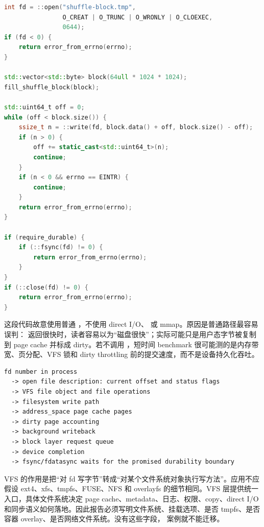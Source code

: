\begin{lstlisting}[language=C++,caption={write VFS probe：固定一个写入案例}]
int fd = ::open("shuffle-block.tmp",
                O_CREAT | O_TRUNC | O_WRONLY | O_CLOEXEC,
                0644);
if (fd < 0) {
    return error_from_errno(errno);
}

std::vector<std::byte> block(64ull * 1024 * 1024);
fill_shuffle_block(block);

std::uint64_t off = 0;
while (off < block.size()) {
    ssize_t n = ::write(fd, block.data() + off, block.size() - off);
    if (n > 0) {
        off += static_cast<std::uint64_t>(n);
        continue;
    }
    if (n < 0 && errno == EINTR) {
        continue;
    }
    return error_from_errno(errno);
}

if (require_durable) {
    if (::fsync(fd) != 0) {
        return error_from_errno(errno);
    }
}
if (::close(fd) != 0) {
    return error_from_errno(errno);
}
\end{lstlisting}

这段代码故意使用普通 ，不使用 direct I/O、 或 mmap。原因是普通路径最容易误判： 返回很快时，读者容易以为“磁盘很快”；实际可能只是用户态字节被复制到 page cache 并标成 dirty。若不调用 ，短时间 benchmark 很可能测的是内存带宽、页分配、VFS 锁和 dirty throttling 前的提交速度，而不是设备持久化吞吐。

\begin{lstlisting}[numbers=none,caption={本案例的 VFS/page cache 逻辑路径}]
fd number in process
  -> open file description: current offset and status flags
  -> VFS file object and file operations
  -> filesystem write path
  -> address_space page cache pages
  -> dirty page accounting
  -> background writeback
  -> block layer request queue
  -> device completion
  -> fsync/fdatasync waits for the promised durability boundary
\end{lstlisting}

VFS 的作用是把“对 fd 写字节”转成“对某个文件系统对象执行写方法”。应用不应假设 ext4、xfs、tmpfs、FUSE、NFS 和 overlayfs 的细节相同。VFS 层提供统一入口，具体文件系统决定 page cache、metadata、日志、权限、copy、direct I/O 和同步语义如何落地。因此报告必须写明文件系统、挂载选项、是否 tmpfs、是否容器 overlay、是否网络文件系统。没有这些字段， 案例就不能迁移。

